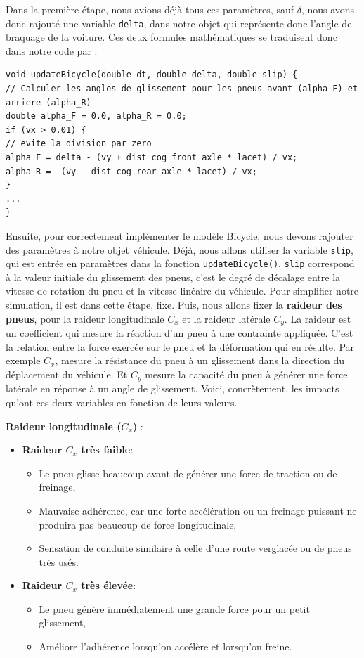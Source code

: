 Dans la première étape, nous avions déjà tous ces paramètres, sauf $\delta$, nous avons donc rajouté une variable \texttt{delta}, dans notre objet qui représente donc l'angle de braquage de la voiture. Ces deux formules mathématiques se traduisent donc dans notre code par :

\begin{lstlisting}[style=CStyle]
void updateBicycle(double dt, double delta, double slip) {
// Calculer les angles de glissement pour les pneus avant (alpha_F) et arriere (alpha_R)
double alpha_F = 0.0, alpha_R = 0.0;
if (vx > 0.01) {
// evite la division par zero
alpha_F = delta - (vy + dist_cog_front_axle * lacet) / vx;
alpha_R = -(vy - dist_cog_rear_axle * lacet) / vx;
}
...
}
\end{lstlisting}



Ensuite, pour correctement implémenter le modèle Bicycle, nous devons rajouter des paramètres à notre objet véhicule. Déjà, nous allons utiliser la variable \texttt{slip}, qui est entrée en paramètres dans la fonction \texttt{updateBicycle()}. \texttt{slip} correspond à la valeur initiale du glissement des pneus, c'est le degré de décalage entre la vitesse de rotation du pneu et la vitesse linéaire du véhicule. Pour simplifier notre simulation, il est dans cette étape, fixe. Puis, nous allons fixer la \textbf{raideur des pneus}, pour la raideur longitudinale $C_x$ et la raideur latérale $C_y$. La raideur est un coefficient qui mesure la réaction d'un pneu à une contrainte appliquée. C'est la relation entre la force exercée sur le pneu et la déformation qui en résulte. Par exemple $C_x$, mesure la résistance du pneu à un glissement dans la direction du déplacement du véhicule. Et $C_y$ mesure la capacité du pneu à générer une force latérale en réponse à un angle de glissement. Voici, concrètement, les impacts qu'ont ces deux variables en fonction de leurs valeurs.

\textbf{Raideur longitudinale ($C_x$) }:
\begin{itemize}
\item \textbf{Raideur $C_x$ très faible}:
\begin{itemize}[label=$\star$]
\item Le pneu glisse beaucoup avant de générer une force de traction ou de freinage,
\item Mauvaise adhérence, car une forte accélération ou un freinage puissant ne produira pas beaucoup de force longitudinale,
\item Sensation de conduite similaire à celle d’une route verglacée ou de pneus très usés.
\end{itemize}

\item \textbf{Raideur $C_x$ très élevée}:
\begin{itemize}[label=$\star$]
\item Le pneu génère immédiatement une grande force pour un petit glissement,
\item Améliore l’adhérence lorsqu'on accélère et lorsqu'on freine.
\end{itemize}
\end{itemize}

